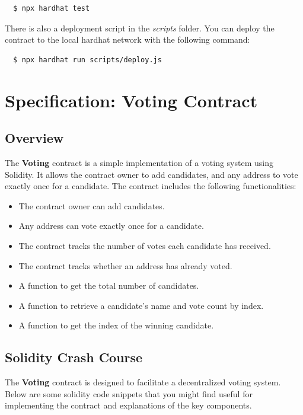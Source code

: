 \documentclass[12pt]{article}
\begin{document}
\begin{verbatim}
  $ npx hardhat test
\end{verbatim}

There is also a deployment script in the \textit{scripts} folder. You can deploy the contract to the local hardhat network with the following command:
\begin{verbatim}
  $ npx hardhat run scripts/deploy.js
\end{verbatim}

\section{Specification: Voting Contract}

\subsection{Overview}

The \textbf{Voting} contract is a simple implementation of a voting system using Solidity. It allows the contract owner to add candidates, and any address to vote exactly once for a candidate. The contract includes the following functionalities:
\begin{itemize}
    \item The contract owner can add candidates.
    \item Any address can vote exactly once for a candidate.
    \item The contract tracks the number of votes each candidate has received.
    \item The contract tracks whether an address has already voted.
    \item A function to get the total number of candidates.
    \item A function to retrieve a candidate's name and vote count by index.
    \item A function to get the index of the winning candidate.
\end{itemize}

\subsection{Solidity Crash Course}

The \textbf{Voting} contract is designed to facilitate a decentralized voting system. Below are some solidity code snippets that you might find useful for implementing the contract and explanations of the key components.
\end{document}
